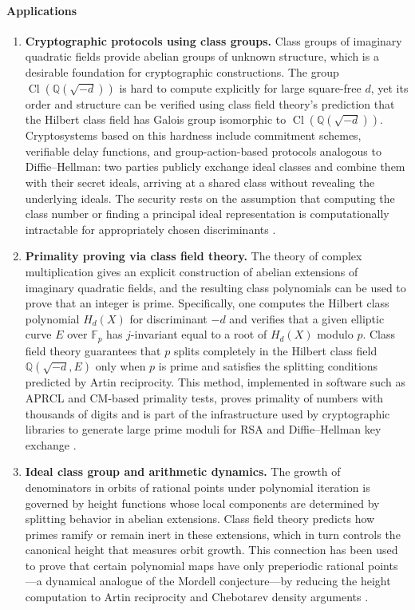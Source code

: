 \paragraph{Applications}
\begin{enumerate}[leftmargin=*,itemsep=0.35em]
\item \textbf{Cryptographic protocols using class groups.} Class groups of imaginary quadratic fields provide abelian groups of unknown structure, which is a desirable foundation for cryptographic constructions. The group $\operatorname{Cl}(\mathbb Q(\sqrt{-d}))$ is hard to compute explicitly for large square-free $d$, yet its order and structure can be verified using class field theory's prediction that the Hilbert class field has Galois group isomorphic to $\operatorname{Cl}(\mathbb Q(\sqrt{-d}))$. Cryptosystems based on this hardness include commitment schemes, verifiable delay functions, and group-action-based protocols analogous to Diffie--Hellman: two parties publicly exchange ideal classes and combine them with their secret ideals, arriving at a shared class without revealing the underlying ideals. The security rests on the assumption that computing the class number or finding a principal ideal representation is computationally intractable for appropriately chosen discriminants \cite{class_field_theory_ref1,class_field_theory_ref4}.
\item \textbf{Primality proving via class field theory.} The theory of complex multiplication gives an explicit construction of abelian extensions of imaginary quadratic fields, and the resulting class polynomials can be used to prove that an integer is prime. Specifically, one computes the Hilbert class polynomial $H_d(X)$ for discriminant $-d$ and verifies that a given elliptic curve $E$ over $\mathbb F_p$ has $j$-invariant equal to a root of $H_d(X)$ modulo $p$. Class field theory guarantees that $p$ splits completely in the Hilbert class field $\mathbb Q(\sqrt{-d},E)$ only when $p$ is prime and satisfies the splitting conditions predicted by Artin reciprocity. This method, implemented in software such as APRCL and CM-based primality tests, proves primality of numbers with thousands of digits and is part of the infrastructure used by cryptographic libraries to generate large prime moduli for RSA and Diffie--Hellman key exchange \cite{class_field_theory_ref2,class_field_theory_ref3}.
\item \textbf{Ideal class group and arithmetic dynamics.} The growth of denominators in orbits of rational points under polynomial iteration is governed by height functions whose local components are determined by splitting behavior in abelian extensions. Class field theory predicts how primes ramify or remain inert in these extensions, which in turn controls the canonical height that measures orbit growth. This connection has been used to prove that certain polynomial maps have only preperiodic rational points---a dynamical analogue of the Mordell conjecture---by reducing the height computation to Artin reciprocity and Chebotarev density arguments \cite{class_field_theory_ref1,class_field_theory_ref7}.
\end{enumerate}
